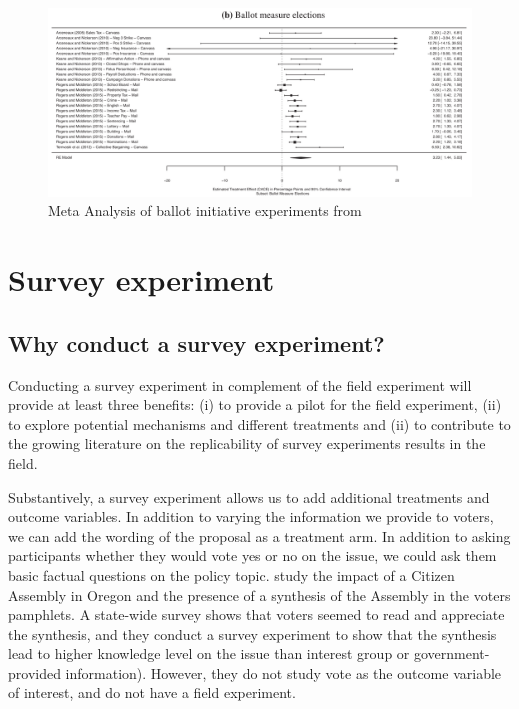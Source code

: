 \documentclass[12pt,final,fleqn]{article}
\theoremstyle{plain}
\begin{document}
\begin{figure}[h]
\includegraphics[scale=0.4]{meta_ballot}
\bigbreak
\caption{Meta Analysis of ballot initiative experiments from \citet{kalla2018minimal}}
\label{fig: kb_meta}
\end{figure}


\section{Survey experiment} \label{sec:Design survey}


\subsection{Why conduct a survey experiment?} \label{sec: questions}

Conducting a survey experiment in complement of the field experiment will provide at least three benefits: (i) to provide a pilot for the field experiment, (ii) to explore potential mechanisms and different treatments and (ii) to contribute to the growing literature on the replicability of survey experiments results in the field. 

Substantively, a survey experiment allows us to add additional treatments and outcome variables. In addition to varying the information we provide to voters, we can add the wording of the proposal as a treatment arm. In addition to asking participants whether they would vote yes or no on the issue, we could ask them basic factual questions on the policy topic. \citet{knobloch2014empowering} study the impact of a Citizen Assembly in Oregon and the presence of a synthesis of the Assembly in the voters pamphlets. A state-wide survey shows that voters seemed to read and appreciate the synthesis, and they conduct a survey experiment to show that the synthesis lead to higher knowledge level on the issue than interest group or government-provided information). However, they do not study vote as the outcome variable of interest, and do not have a field experiment. 
\end{document}
